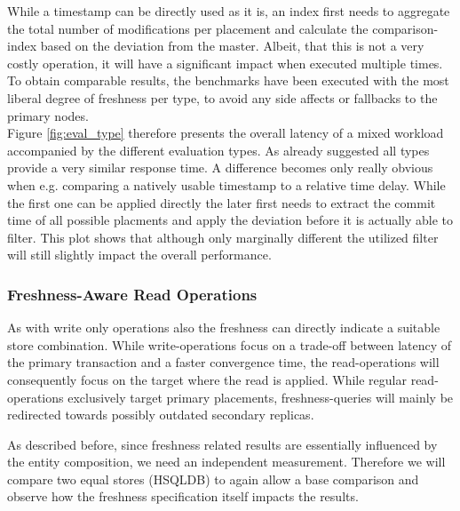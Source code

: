 While a timestamp can be directly used as it is, an index first needs to aggregate the total number of modifications per placement and 
calculate the comparison-index based on the deviation from the master.
Albeit, that this is not a very costly operation, it will have a significant impact when executed multiple times.
To obtain comparable results, the benchmarks have been executed with the most liberal degree of freshness per type, to avoid any side affects or fallbacks to the primary nodes.\\
Figure \ref{fig:eval_type} therefore presents the overall latency of a mixed workload accompanied by the different evaluation types.
As already suggested all types provide a very similar response time. A difference becomes only really obvious when e.g. comparing a natively usable
timestamp to a relative time delay. While the first one can be applied directly the later first
needs to extract the commit time of all possible placments and apply the deviation before it is actually able to filter.
This plot shows that although only marginally different the utilized filter will still slightly impact the overall performance.





\subsubsection{Freshness-Aware Read Operations}

As with write only operations also the freshness can directly indicate a suitable store combination.
While write-operations focus on a trade-off between latency of the primary transaction and a faster convergence time,
the read-operations will consequently focus on the target where the read is applied. While regular read-operations exclusively target
primary placements, freshness-queries will mainly be redirected towards possibly outdated secondary replicas.


As described before, since freshness related results are essentially influenced by the entity composition, we need an independent measurement.
Therefore we will  compare two equal stores (HSQLDB) to again allow a base comparison and observe how the freshness specification itself impacts the results.


